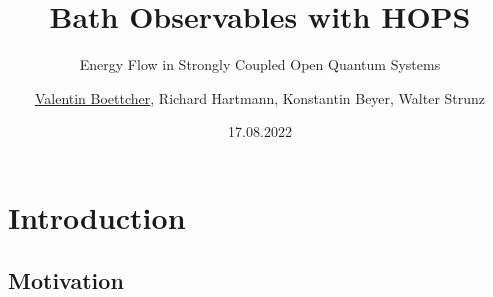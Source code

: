 \documentclass[10pt, aspectratio=169]{beamer}
\institute[TUD] %
{
  TU Dresden
}
\title{Bath Observables with HOPS}
\subtitle{Energy Flow in Strongly Coupled Open Quantum Systems}
\author{\underline{Valentin Boettcher}, Richard Hartmann,
  Konstantin Beyer, Walter Strunz}
\institute{Institute for Theoretical Physics, Dresden, Germany}
\date{17.08.2022}
\begin{document}
\hypersetup{pageanchor=false}
\begin{frame}[plain]
  \titlepage
\end{frame}

\begin{frame}
  \tableofcontents
\end{frame}


\section{Introduction}
\label{sec:intro}

\subsection{Motivation}
\end{document}
